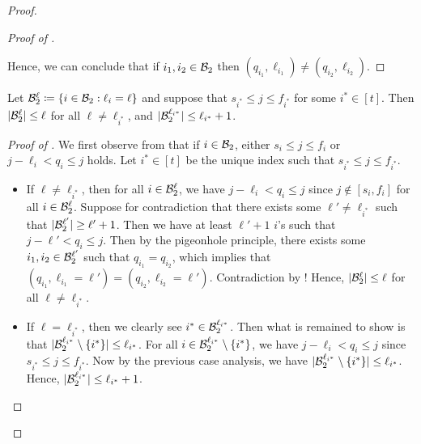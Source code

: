 \begin{proof}
\begin{proof}[Proof of ]
\begin{enumerate}
\end{enumerate}
Hence, we can conclude that if $i_1,i_2\in{\ensuremath{\mathcal{B}}}_2$ then $(q_{i_1},\ell_{i_1})\neq(q_{i_2},\ell_{i_2})$.   
\end{proof}


\begin{claim}
    Let ${\mathcal{B}}_2^\ell\coloneqq\{i\in{\ensuremath{\mathcal{B}}}_2:\ell_i=\ell\}$ and suppose that $s_{i^*}\leq j\leq f_{i^*}$ for some $i^*\in[t]$. Then $|{\mathcal{B}}_2^\ell|\leq\ell$ for all $\ell\neq \ell_{i^*}$, and $|{\mathcal{B}}_2^{\ell_{i^*}}|\leq\ell_{i^*}+1$.
\end{claim}

\begin{proof}[Proof of ]
We first observe from  that if $i\in{\ensuremath{\mathcal{B}}}_2$, either $s_i\leq j\leq f_i$ or $j-\ell_i<q_i\leq j$ holds. Let $i^*\in[t]$ be the unique index such that $s_{i^*}\leq j\leq f_{i^*}$.
\begin{itemize}
    \item If $\ell\neq\ell_{i^*}$, then for all $i\in{\ensuremath{\mathcal{B}}}_2^\ell$, we have $j-\ell_i<q_i\leq j$ since $j\not\in[s_i,f_i]$ for all $i\in{\ensuremath{\mathcal{B}}}_2^\ell$. Suppose for contradiction that there exists some $\ell'\neq\ell_{i^*}$ such that $|{\mathcal{B}}_2^{\ell'}|\geq \ell'+1$. Then we have at least $\ell'+1$ $i$'s such that $j-\ell'<q_i\leq j$. Then by the pigeonhole principle, there exists some $i_1,i_2\in{\ensuremath{\mathcal{B}}}_2^{\ell'}$ such that $q_{i_1}=q_{i_2}$, which implies that $(q_{i_1},\ell_{i_1}=\ell')=(q_{i_2},\ell_{i_2}=\ell')$. Contradiction by ! Hence, $|{\mathcal{B}}_2^\ell|\leq\ell$ for all $\ell\neq \ell_{i^*}$.
    \item If $\ell=\ell_{i^*}$, then we clearly see $i^*\in{\ensuremath{\mathcal{B}}}_2^{\ell_{i^*}}$. Then what is remained to show is that $|{\mathcal{B}}_2^{\ell_{i^*}}\setminus\{i^*\}|\leq\ell_{i^*}$. For all $i\in {\ensuremath{\mathcal{B}}}_2^{\ell_{i^*}}\setminus\{i^*\}$, we have $j-\ell_i<q_i\leq j$ since $s_{i^*}\leq j\leq f_{i^*}$. Now by the previous case analysis, we have $|{\mathcal{B}}_2^{\ell_{i^*}}\setminus\{i^*\}|\leq \ell_{i^*}$. Hence, $|{\mathcal{B}}_2^{\ell_{i^*}}|\leq\ell_{i^*}+1$.\qedhere
\end{itemize}
\end{proof}


\end{proof}
